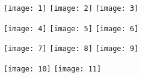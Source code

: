 \documentclass{article}
\begin{document}
\begin{figure}[htp]
\centering
\texttt{[image: 1]}\quad
\texttt{[image: 2]}\quad
\texttt{[image: 3]}

\medskip

\texttt{[image: 4]}\quad
\texttt{[image: 5]}\quad
\texttt{[image: 6]}

\medskip

\texttt{[image: 7]}\quad
\texttt{[image: 8]}\quad
\texttt{[image: 9]}

\medskip

\texttt{[image: 10]}\quad
\texttt{[image: 11]}
\end{figure}
\end{document}
